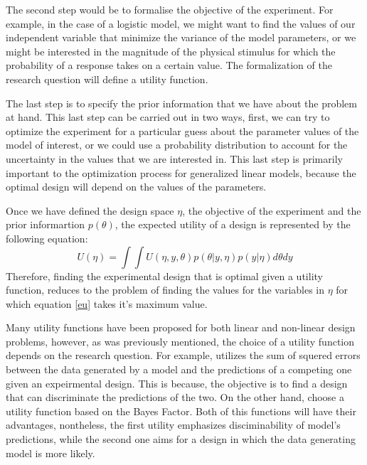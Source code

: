 \documentclass[preprint,review,12pt]{elsarticle}
\begin{document}
The second step would be to formalise the objective of the experiment. For example, in the case of a logistic model, we might want to find the values of our independent variable that minimize the variance of the model parameters, or we might be interested in the magnitude of the physical stimulus for which the probability of a response takes on a certain value. The formalization of the research question will define a utility function.

The last step is to specify the prior information that we have about the problem at hand. This last step can be carried out in two ways, first, we can try to optimize the experiment for a particular guess about the parameter values of the model of interest, or we could use a probability distribution to account for the uncertainty in the values that we are interested in. This last step is primarily important to the optimization process for generalized linear models, because the optimal design will depend on the values of the parameters.


Once we have defined the design space $\eta$, the objective of the experiment and the prior informartion $p(\theta)$, the expected utility of a design is represented by the following equation:
\begin{equation}
U(\eta)=\int \int U(\eta,y,\theta)p(\theta|y,\eta)p(y|\eta) d\theta dy
\label{eu}
\end{equation}
Therefore, finding the experimental design that is optimal given a utility function, reduces to the problem of finding the values for the variables in $\eta$ for which equation \ref{eu} takes it's maximum value.

Many utility functions have been proposed for both linear and non-linear design problems, however, as was previously mentioned, the choice of a utility function depends on the research question. For example, \cite{Myung2009} utilizes the sum of squered errors between the data generated by a model and the predictions of a competing one given an expeirmental design. This is because, the objective is to find a design that can discriminate the predictions of the two. On the other hand, \cite{ZL2010} choose a utility function based on the Bayes Factor. Both of this functions will have their advantages, nontheless, the first utility emphasizes disciminability of model's predictions, while the second one aims for a design in which the data generating model is more likely.
\end{document}
